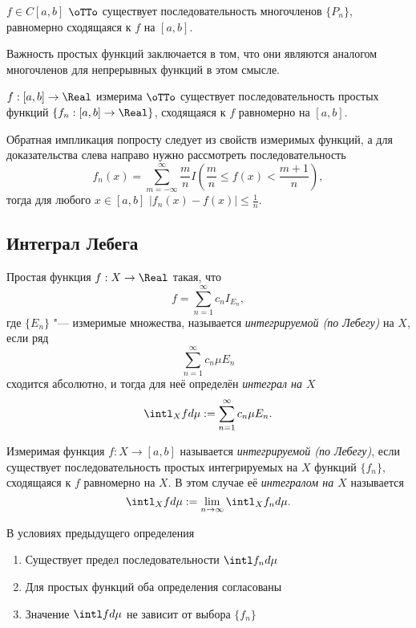 \documentclass[main]{subfiles}
\begin{document}
\begin{theorem*}[Вейерштрасса]
  \( f \in C[a, b] \) \( \oTTo \)
  существует последовательность
  многочленов \( \{ P_n \} \),
  равномерно сходящаяся к \( f \)
  на \( [a, b] \).
\end{theorem*}

Важность простых функций заключается в том,
что они являются аналогом многочленов
для непрерывных функций в этом смысле.

\begin{theorem*}
  \( f : [a, b] \to \Real \)
  измерима \( \oTTo \)
  существует последовательность
  простых функций
  \( \{ f_n : [a, b] \to \Real \} \),
  сходящаяся к \( f \) равномерно на \( [a, b] \).
\end{theorem*}

Обратная импликация попросту следует из свойств
измеримых функций, а для доказательства слева
направо нужно рассмотреть последовательность
\[
  f_n(x) =
  \sum_{m =-\infty}^\infty \frac{m}{n}
  I(\frac{m}{n} \le f(x) < \frac{m+1}{n}),
\]
тогда для любого \( x \in [a, b] \)
\( |f_n(x) - f(x)| \le \frac1n \).

\subsection{Интеграл Лебега}

\begin{definition}
  Простая функция \( f : X \to \Real \)
  такая, что
  \[
    f = \sum_{n = 1}^\infty c_n I_{E_n},
  \]
  где \( \{ E_n \} \) "--- измеримые множества,
  называется \emph{интегрируемой (по Лебегу)} на \( X \),
  если ряд
  \[
    \sum_{n=1}^\infty c_n \mu E_n
  \]
  сходится абсолютно,
  и тогда для неё определён
  \emph{интеграл на \( X \)}
  \[
    \intl_X f d \mu :=
    \sum_{n=1}^\infty c_n \mu E_n.
  \]
\end{definition}

\begin{definition}
  Измеримая функция \( f : X \to [a, b] \)
  называется \emph{интегрируемой (по Лебегу)},
  если существует последовательность
  простых интегрируемых на \( X \) функций
  \( \{ f_n \} \), сходящаяся к \( f \)
  равномерно на \( X \).
  В этом случае её \emph{интегралом на \( X \)}
  называется
  \[
    \intl_X f d\mu :=
    \lim_{n \to \infty} \intl_X f_n d\mu.
  \]
\end{definition}

\begin{proposition}
  В условиях предыдущего определения
  \begin{enumerate}
    \item Существует предел последовательности
      \( \intl f_n d\mu \)
    \item Для простых функций оба определения согласованы
    \item Значение \( \intl f d\mu \) не зависит
      от выбора \( \{ f_n \} \)
  \end{enumerate}
\end{proposition}
\end{document}
